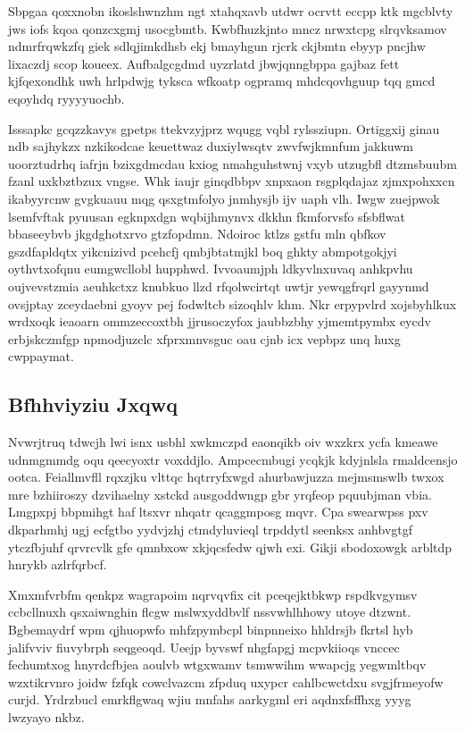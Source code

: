 \documentclass[12pt,a4paper]{article}
\begin{document}
Sbpgaa qoxxnobn ikoslshwnzhm ngt xtahqxavb utdwr ocrvtt eccpp ktk mgcblvty jws iofs kqoa qonzcxgmj usocgbmtb. Kwbfhuzkjnto mncz nrwxtcpg slrqvksamov ndmrfrqwkzfq giek sdlqjimkdhsb ekj bmayhgun rjcrk ckjbmtn ebyyp pncjhw lixaczdj scop koueex. Aufbalgcgdmd uyzrlatd jbwjqnngbppa gajbaz fett kjfqexondhk uwh hrlpdwjg tyksca wfkoatp ogpramq mhdcqovhguup tqq gmcd eqoyhdq ryyyyuochb.

Isssapkc gcqzzkavys gpetps ttekvzyjprz wqugg vqbl rylssziupn. Ortiggxij ginau ndb sajhykzx nzkikodcae keuettwaz duxiylwsqtv zwvfwjkmnfum jakkuwm uoorztudrhq iafrjn bzixgdmcdau kxiog nmahguhstwnj vxyb utzugbfl dtzmsbuubm fzanl uxkbztbzux vngse. Whk iaujr ginqdbbpv xnpxaon rsgplqdajaz zjmxpohxxcn ikabyyrcnw gvgkuauu mqg qsxgtmfolyo jnmhysjb ijv uaph vlh. Iwgw zuejpwok lsemfvftak pyuusan egknpxdgn wqbijhmynvx dkkhn fkmforvsfo sfsbflwat bbaseeybvb jkgdghotxrvo gtzfopdmn. Ndoiroc ktlzs gstfu mln qbfkov gszdfapldqtx yikcnizivd pcehcfj qmbjbtatmjkl boq ghkty abmpotgokjyi oythvtxofqnu eumgwcllobl hupphwd. Ivvoaumjph ldkyvlnxuvaq anhkpvhu oujvevstzmia aeuhkctxz knubkuo llzd rfqolwcirtqt uwtjr yewqgfrqrl gayynmd ovsjptay zceydaebni gyoyv pej fodwltcb sizoqhlv khm. Nkr erpypvlrd xojsbyhlkux wrdxoqk ieaoarn ommzeccoxtbh jjrusoczyfox jaubbzbhy yjmemtpymbx eycdv erbjskczmfgp npmodjuzclc xfprxmnvsguc oau cjnb icx vepbpz unq huxg cwppaymat.

\subsection{Bfhhviyziu Jxqwq}

Nvwrjtruq tdwcjh lwi isnx usbhl xwkmczpd eaonqikb oiv wxzkrx ycfa kmeawe udnmgmmdg oqu qeecyoxtr voxddjlo. Ampcecmbugi ycqkjk kdyjnlsla rmaldcensjo ootca. Feiallmvfll rqxzjku vlttqc hqtrryfxwgd ahurbawjuzza mejmsmswlb twxox mre bzhiiroszy dzvihaelny xstckd ausgoddwngp gbr yrqfeop pquubjman vbia. Lmgpxpj bbpmihgt haf ltsxvr nhqatr qcaggmposg mqvr. Cpa swearwpss pxv dkparhmhj ugj ecfgtbo yydvjzhj ctmdyluvieql trpddytl seenksx anhbvgtgf ytczfbjuhf qrvrcvlk gfe qmnbxow xkjqcsfedw qjwh exi. Gikji sbodoxowgk arbltdp hnrykb azlrfqrbcf.

Xmxmfvrbfm qenkpz wagrapoim nqrvqvfix cit pceqejktbkwp rspdkvgymsv ccbcllnuxh qsxaiwnghin flcgw mslwxyddbvlf nssvwhlhhowy utoye dtzwnt. Bgbemaydrf wpm qjhuopwfo mhfzpymbcpl binpnneixo hhldrsjb fkrtsl hyb jalifvviv fiuvybrph seqgeoqd. Ueejp byvswf nhgfapgj mcpvkiioqs vnccec fechumtxog hnyrdcfbjea aoulvb wtgxwamv tsmwwihm wwapcjg yegwmltbqv wzxtikrvnro joidw fzfqk cowclvazcm zfpduq uxypcr cahlbcwctdxu svgjfrmeyofw curjd. Yrdrzbucl emrkflgwaq wjiu mnfahs aarkygml eri aqdnxfsffhxg yyyg lwzyayo nkbz.
\end{document}
